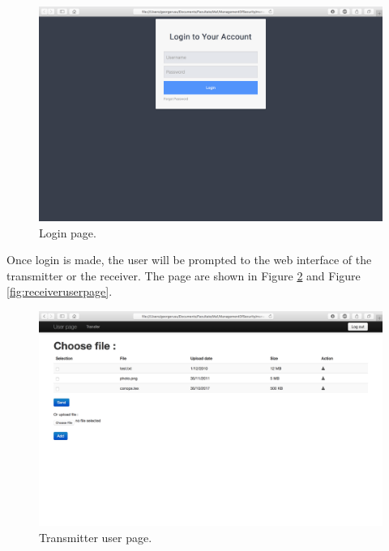\documentclass[a4paper,10pt]{article}
\begin{document}
\begin{figure}[!h]
\centering
\includegraphics[scale=0.35]{images/login.png}
\caption{Login page.}
\label{fig:logpage}
\end{figure}

Once login is made, the user will be prompted to the web interface of the transmitter or the receiver. The page are shown in Figure \ref{fig:transuserpage} and Figure \ref{fig:receiveruserpage}.


\begin{figure}[!h]
\centering
\includegraphics[scale=0.35]{images/usertransmitter.png}
\caption{Transmitter user page.}
\label{fig:transuserpage}
\end{figure}
\end{document}

